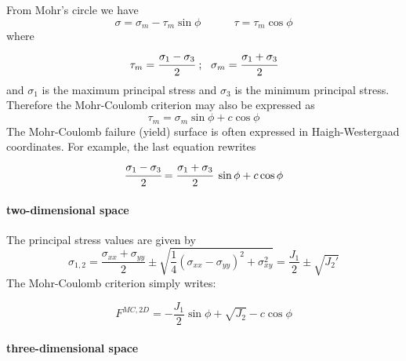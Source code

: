 From Mohr's circle we have
\[
\sigma = \sigma_m - \tau_m \sin\phi  \quad\quad\quad  \tau = \tau_m \cos\phi 
\]
where
\[
\tau_m = \cfrac{\sigma_1-\sigma_3}{2} ~;~~ \sigma_m = \cfrac{\sigma_1+\sigma_3}{2} 
\]
and $\sigma_1$ is the maximum principal stress and $\sigma_3$ is the minimum principal stress.
Therefore the Mohr-Coulomb criterion may also be expressed as
\[
\tau_m = \sigma_m \sin\phi + c \cos\phi  
\]
The Mohr-Coulomb failure (yield) surface is often expressed in Haigh-Westergaad coordinates. For example, the last equation rewrites
\[
\cfrac{\sigma_1-\sigma_3}{2} = \cfrac{\sigma_1+\sigma_3}{2}~\sin\phi + c\cos\phi 
\]

\paragraph{two-dimensional space}

The principal stress values are given by
\[
\sigma_{1,2} = \frac{\sigma_{xx}+\sigma_{yy}}{2} \pm \sqrt{ \frac{1}{4}(\sigma_{xx}-\sigma_{yy})^2 + \sigma_{xy}^2  }
= \frac{J_1}{2} \pm \sqrt{ J_2'}
\]
The Mohr-Coulomb criterion simply writes:

\begin{mdframed}[backgroundcolor=blue!5]
\[
F^{MC,2D}=  -\frac{J_1}{2} \sin \phi + \sqrt{J_2} - c  \cos \phi  \label{mc2Dcriterion}
\]
\end{mdframed}



\paragraph{three-dimensional space}




